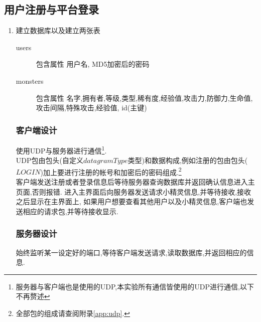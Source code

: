 \documentclass{article}
\begin{document}
\subsection{用户注册与平台登录}
  \begin{enumerate}
  \item 建立数据库以及建立两张表
    \begin{description}
    \item[users] 包含属性 用户名, MD5加密后的密码
    \item[monsters] 包含属性 名字,拥有者,等级,类型,稀有度,经验值,攻击力,防御力,生命值,攻击间隔,特殊攻击,经验值, id(主键)
    \end{description}
    
\subsubsection{客户端设计}
    使用UDP与服务器进行通信\footnote{服务器与客户端也是使用的UDP,本实验所有通信皆使用的UDP进行通信,以下不再赘述}.\\
    UDP包由包头(自定义$datagramType$类型)和数据构成,例如注册的包由包头($LOGIN$)加上要进行注册的帐号和加密后的密码组成.\footnote{
      全部包的组成请查阅附录\ref{app:udp}.}\\
    客户端发送注册或者登录信息后等待服务器查询数据库并返回确认信息进入主页面,否则报错.
    进入主界面后向服务器发送请求小精灵信息,并等待接收,接收之后显示在主界面上,
    如果用户想要查看其他用户以及小精灵信息,客户端也发送相应的请求包,并等待接收显示.\\
   
  \subsubsection{服务器设计}
    始终监听某一设定好的端口,等待客户端发送请求,读取数据库,并返回相应的信息.
  \end{enumerate}
  
\end{document}

